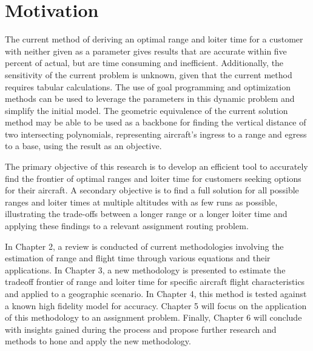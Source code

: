 \section{Motivation}
\hspace{.5cm}The current method of deriving an optimal range and loiter time for a customer with neither given as a parameter gives results that are accurate within five percent of actual, but are time consuming and inefficient. Additionally, the sensitivity of the current problem is unknown, given that the current method requires tabular calculations. The use of goal programming and optimization methods can be used to leverage the parameters in this dynamic problem and simplify the initial model. The geometric equivalence of the current solution method may be able to be used as a backbone for finding the vertical distance of two intersecting polynomials, representing aircraft's ingress to a range and egress to a base, using the result as an objective.\par
The primary objective of this research is to develop an efficient tool to accurately find the frontier of optimal ranges and loiter time for customers seeking options for their aircraft. A secondary objective is to find a full solution for all possible ranges and loiter times at multiple altitudes with as few runs as possible, illustrating the trade-offs between a longer range or a longer loiter time and applying these findings to a relevant assignment routing problem. \par
In Chapter 2, a review is conducted of current methodologies involving the estimation of range and flight time through various equations and their applications. In Chapter 3, a new methodology is presented to estimate the tradeoff frontier of range and loiter time for specific aircraft flight characteristics and applied to a geographic scenario. In Chapter 4, this method is tested against a known high fidelity model for accuracy. Chapter 5 will focus on the application of this methodology to an assignment problem. Finally, Chapter 6 will conclude with insights gained during the process and propose further research and methods to hone and apply the new methodology.

